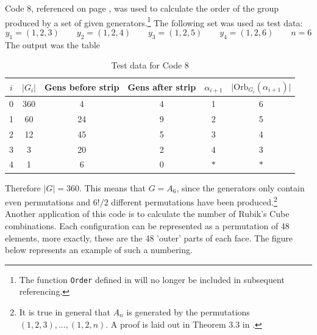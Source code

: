 \documentclass[10pt,a4paper,notitlepage]{article}
\newcommand{\abs}[1]{\lvert#1\rvert}
\newcommand{\Orb}{\text{Orb}}
\begin{document}
Code 8, referenced on page \pageref{cd:8}, was used to calculate the order of the group produced by a set of given generators.\footnote{The function \texttt{Order} defined in  will no longer be included in subsequent referencing.} The following set was used as test data:
\begin{equation*}
y_{1}=(1,2,3) \quad \quad y_{2}=(1,2,4)  \quad \quad y_{3}=(1,2,5)  \quad \quad y_{4}=(1,2,6)  \quad \quad n=6
\end{equation*}
The output was the table
\begin{table}[H]
\centering
\begin{tabular}{c|c|c|c|c|c}
$i$ & $\abs{G_{i}}$ & Gens before strip & Gens after strip & $\alpha_{i+1}$ & $\abs{\Orb_{G_{i}}(\alpha_{i+1})}$\\
\hline 0& 360 & 4 & 4 & 1 & 6\\ 
1& 60 & 24 & 9 & 2 & 5\\ 
2& 12 & 45 & 5 & 3 & 4\\ 
3 & 3 & 20 & 2 & 4 & 3\\
4 & 1 & 6 & 0 & $\ast$ & $\ast$ \\

\end{tabular}
\caption{Test data for Code 8}
\end{table}
Therefore $\abs{G}=360$. This means that $G=A_{6}$, since the generators only contain even permutations and $6!/2$ different permutations have been produced.\footnote{It is true in general that $A_{n}$ is generated by the permutations $(1,2,3),\hdots ,(1,2,n)$. A proof is laid out in Theorem 3.3 in \cite{PermStuff}.}\\

Another application of this code is to calculate the number of Rubik's Cube combinations. Each configuration can be represented as a permutation of 48 elements, more exactly, these are the 48 'outer' parts of each face. The figure below represents an example of such a numbering.
\end{document}
